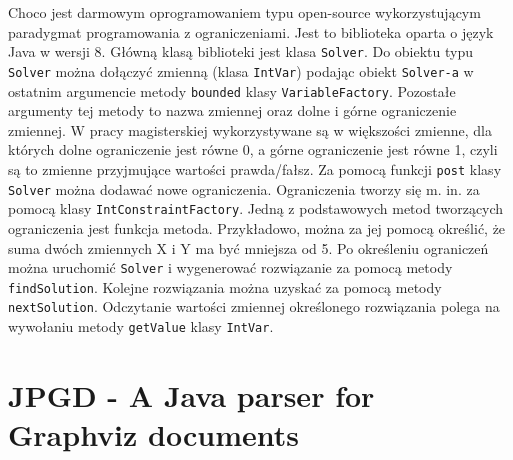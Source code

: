 Choco\cite{Choco3} jest darmowym oprogramowaniem typu open-source wykorzystującym paradygmat programowania z ograniczeniami. Jest to biblioteka oparta o język Java w wersji 8. Główną klasą biblioteki jest klasa \texttt{Solver}. 
Do obiektu typu \texttt{Solver} można dołączyć zmienną (klasa \texttt{IntVar}) podając obiekt \texttt{Solver-a} w ostatnim argumencie metody \texttt{bounded} klasy \texttt{VariableFactory}. Pozostałe argumenty tej metody to nazwa zmiennej oraz dolne i górne ograniczenie zmiennej. W pracy magisterskiej wykorzystywane są w większości zmienne, dla których dolne ograniczenie jest równe 0, a górne ograniczenie jest równe 1, czyli są to zmienne przyjmujące wartości prawda/fałsz. Za pomocą funkcji \texttt{post} klasy \texttt{Solver} można dodawać nowe ograniczenia. Ograniczenia tworzy się m. in. za pomocą klasy \texttt{IntConstraintFactory}. Jedną z podstawowych metod tworzących ograniczenia jest funkcja metoda. Przykładowo, można za jej pomocą określić, że suma dwóch zmiennych X i Y ma być mniejsza od 5. Po określeniu ograniczeń można uruchomić \texttt{Solver} i wygenerować rozwiązanie za pomocą metody \texttt{findSolution}. Kolejne rozwiązania można uzyskać za pomocą metody \texttt{nextSolution}. Odczytanie wartości zmiennej określonego rozwiązania polega na wywołaniu metody \texttt{getValue} klasy \texttt{IntVar}. 

\section{JPGD - A Java parser for Graphviz documents}



